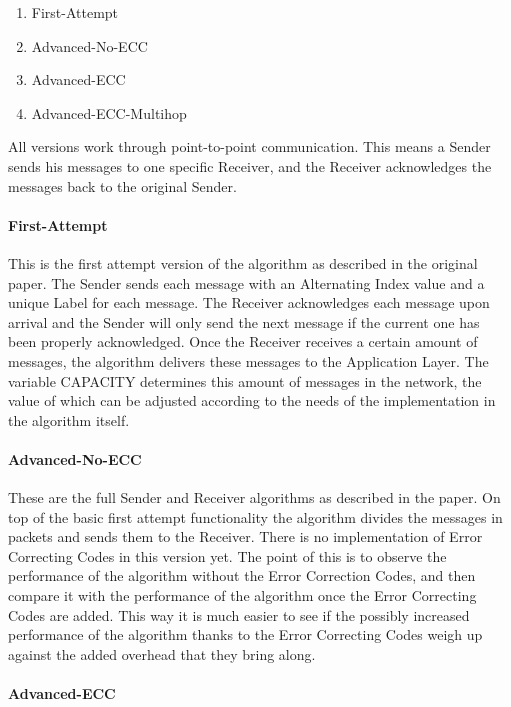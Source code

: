 \begin{enumerate}
\def\labelenumi{\arabic{enumi}.}
\itemsep1pt\parskip0pt
\item
  First-Attempt
\item
  Advanced-No-ECC
\item
  Advanced-ECC
\item
  Advanced-ECC-Multihop
\end{enumerate}

All versions work through point-to-point communication. This means a
Sender sends his messages to one specific Receiver, and the Receiver
acknowledges the messages back to the original Sender.

\paragraph{First-Attempt}\label{first-attempt}

This is the first attempt version of the algorithm as described in the
original paper. The Sender sends each message with an Alternating Index
value and a unique Label for each message. The Receiver acknowledges
each message upon arrival and the Sender will only send the next message
if the current one has been properly acknowledged. Once the Receiver
receives a certain amount of messages, the algorithm delivers these
messages to the Application Layer. The variable CAPACITY determines this
amount of messages in the network, the value of which can be adjusted
according to the needs of the implementation in the algorithm itself.

\paragraph{Advanced-No-ECC}\label{advanced-no-ecc}

These are the full Sender and Receiver algorithms as described in the
paper. On top of the basic first attempt functionality the algorithm
divides the messages in packets and sends them to the Receiver. There is
no implementation of Error Correcting Codes in this version yet. The
point of this is to observe the performance of the algorithm without the
Error Correction Codes, and then compare it with the performance of the
algorithm once the Error Correcting Codes are added. This way it is much
easier to see if the possibly increased performance of the algorithm
thanks to the Error Correcting Codes weigh up against the added overhead
that they bring along.

\paragraph{Advanced-ECC}\label{advanced-ecc}

